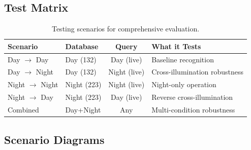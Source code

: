 \documentclass[11pt,a4paper]{article}
\begin{document}
\subsection{Test Matrix}

\begin{table}[H]
    \centering
    \begin{tabular}{llcp{5cm}}
        \toprule
        \textbf{Scenario} & \textbf{Database} & \textbf{Query} & \textbf{What it Tests} \\
        \midrule
        Day $\rightarrow$ Day & Day (132) & Day (live) & Baseline recognition \\
        Day $\rightarrow$ Night & Day (132) & Night (live) & Cross-illumination robustness \\
        Night $\rightarrow$ Night & Night (223) & Night (live) & Night-only operation \\
        Night $\rightarrow$ Day & Night (223) & Day (live) & Reverse cross-illumination \\
        Combined & Day+Night & Any & Multi-condition robustness \\
        \bottomrule
    \end{tabular}
    \caption{Testing scenarios for comprehensive evaluation.}
\end{table}

\subsection{Scenario Diagrams}
\end{document}
